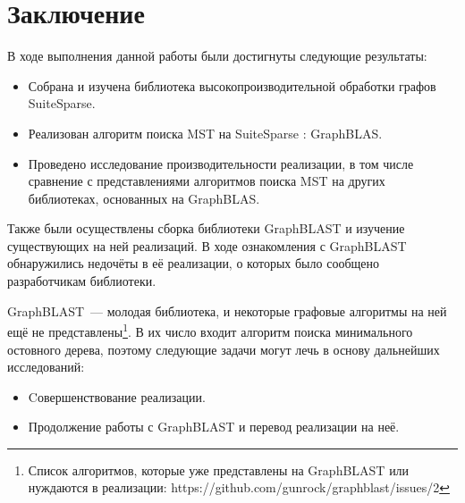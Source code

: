\documentclass[14pt]{matmex-diploma-custom}
\begin{document}
\section*{Заключение}
В ходе выполнения данной работы были достигнуты следующие результаты:
\begin{itemize}
    \item Собрана и изучена библиотека высокопроизводительной обработки графов SuiteSparse.
    \item Реализован алгоритм поиска MST на SuiteSparse : GraphBLAS.
    \item Проведено исследование производительности реализации, в том числе сравнение с представлениями алгоритмов поиска MST на других библиотеках, основанных на GraphBLAS.
\end{itemize}
Также были осуществлены сборка библиотеки GraphBLAST и изучение существующих на ней реализаций. В ходе ознакомления с GraphBLAST обнаружились недочёты в её реализации, о которых было сообщено разработчикам библиотеки.

GraphBLAST~--- молодая библиотека, и некоторые графовые алгоритмы на ней ещё не представлены\footnote{Список алгоритмов, которые уже представлены на GraphBLAST или нуждаются в реализации: https://github.com/gunrock/graphblast/issues/2}. В их число входит алгоритм поиска минимального остовного дерева, поэтому следующие задачи могут лечь в основу дальнейших исследований:
\begin{itemize}
    \item Cовершенствование реализации.
    \item Продолжение работы с GraphBLAST и перевод реализации на неё.
\end{itemize}  

\setmonofont[Mapping=tex-text]{CMU Typewriter Text}

%

\end{document}
